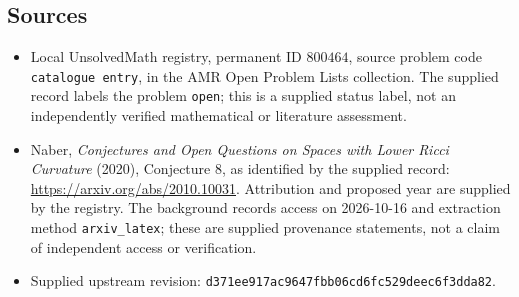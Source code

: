 \documentclass[11pt]{article}
\begin{document}
\subsection{Sources}
\begin{itemize}
\item Local UnsolvedMath registry, permanent ID \(800464\), source problem code \texttt{catalogue entry}, in the AMR Open Problem Lists collection. The supplied record labels the problem \texttt{open}; this is a supplied status label, not an independently verified mathematical or literature assessment.
\item Naber, \emph{Conjectures and Open Questions on Spaces with Lower Ricci Curvature} (2020), Conjecture 8, as identified by the supplied record: \url{https://arxiv.org/abs/2010.10031}. Attribution and proposed year are supplied by the registry. The background records access on 2026-10-16 and extraction method \texttt{arxiv\_latex}; these are supplied provenance statements, not a claim of independent access or verification.
\item Supplied upstream revision: \texttt{d371ee917ac9647fbb06cd6fc529deec6f3dda82}.
\end{itemize}
\end{document}
